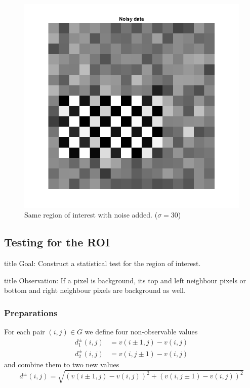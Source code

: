 \documentclass{beamer}
\begin{document}
\begin{frame}
	\begin{figure}
		\includegraphics[width=0.6\linewidth]{Testing/ROI_noisy}
		\caption[Noisy ROI]{Same region of interest with noise added. ($\sigma = 30$)}
		\label{fig:ROI_noisy}
	\end{figure}
\end{frame}

\subsection{Testing for the ROI}

\begin{frame}
	\begin{beamercolorbox}[sep=8pt,center,shadow=true,rounded=true]{title}
		Goal: Construct a statistical test for the region of interest.
	\end{beamercolorbox}
\end{frame}

\begin{frame}
	\begin{beamercolorbox}[sep=8pt,center,shadow=true,rounded=true]{title}
		Observation: If a pixel is background, its top and left neighbour pixels or bottom and right neighbour pixels are background as well.
	\end{beamercolorbox}
\end{frame}

\subsubsection{Preparations}

\begin{frame}
	For each pair $(i, j) \in G$ we define four non-observable values
	\begin{align*}
		d_1^\pm(i, j) &= v(i \pm 1, j) - v(i, j) \\
		d_2^\pm(i, j) &= v(i, j \pm 1) - v(i, j)
	\end{align*}
	and combine them to two new values
	\begin{equation*}\label{d}
		d^\pm(i, j) = \sqrt{(v(i \pm 1, j) - v(i, j))^2 + (v(i, j \pm 1) - v(i, j))^2}
	\end{equation*}
\end{frame}
\end{document}
